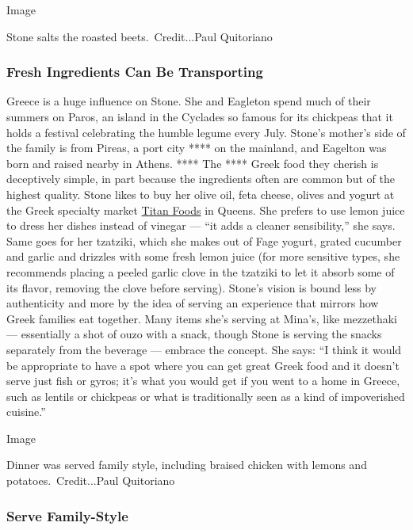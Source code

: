 Image

Stone salts the roasted beets.~Credit...Paul Quitoriano

\hypertarget{fresh-ingredients-can-be-transporting}{%
\subsubsection{Fresh Ingredients Can Be
Transporting}\label{fresh-ingredients-can-be-transporting}}

Greece is a huge influence on Stone. She and Eagleton spend much of
their summers on Paros, an island in the Cyclades so famous for its
chickpeas that it holds a festival celebrating the humble legume every
July. Stone's mother's side of the family is from Pireas, a port city
**** on the mainland, and Eagelton was born and raised nearby in Athens.
**** The **** Greek food they cherish is deceptively simple, in part
because the ingredients often are common but of the highest quality.
Stone likes to buy her olive oil, feta cheese, olives and yogurt at the
Greek specialty market \href{https://www.titanfoods.net/}{Titan Foods}
in Queens. She prefers to use lemon juice to dress her dishes instead of
vinegar --- ``it adds a cleaner sensibility,'' she says. Same goes for
her tzatziki, which she makes out of Fage yogurt, grated cucumber and
garlic and drizzles with some fresh lemon juice (for more sensitive
types, she recommends placing a peeled garlic clove in the tzatziki to
let it absorb some of its flavor, removing the clove before serving).
Stone's vision is bound less by authenticity and more by the idea of
serving an experience that mirrors how Greek families eat together. Many
items she's serving at Mina's, like mezzethaki --- essentially a shot of
ouzo with a snack, though Stone is serving the snacks separately from
the beverage --- embrace the concept. She says: ``I think it would be
appropriate to have a spot where you can get great Greek food and it
doesn't serve just fish or gyros; it's what you would get if you went to
a home in Greece, such as lentils or chickpeas or what is traditionally
seen as a kind of impoverished cuisine.''

Image

Dinner was served family style, including braised chicken with lemons
and potatoes.~Credit...Paul Quitoriano

\hypertarget{serve-family-style-}{%
\subsubsection{Serve Family-Style }\label{serve-family-style-}}

